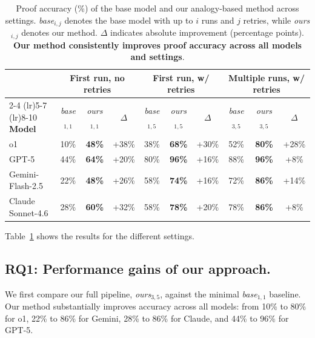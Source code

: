
\begin{table}[t]
\centering
\setlength{\tabcolsep}{5pt}
\begin{tabular}{l | ccc | ccc | ccc}
\toprule
& \multicolumn{3}{c}{\textbf{First run, no retries}} 
& \multicolumn{3}{c}{\textbf{First run, w/ retries}} 
& \multicolumn{3}{c}{\textbf{Multiple runs, w/ retries}} \\
\cmidrule(lr){2-4} \cmidrule(lr){5-7} \cmidrule(lr){8-10}
\textbf{Model }
& \textit{base}$_{1,1}$ & \textit{ours}$_{1,1}$ & $\Delta$ 
& \textit{base}$_{1,5}$ & \textit{ours}$_{1,5}$ & $\Delta$ 
& \textit{base}$_{3,5}$ & \textit{ours}$_{3,5}$ & $\Delta$ \\
\midrule
o1 
& 10\% & \textbf{48\%} & +38\% 
& 38\% & \textbf{68\%} & +30\% 
& 52\% & \textbf{80\%} & +28\% \\

GPT-5 
& 44\% & \textbf{64\%} & +20\% 
& 80\% & \textbf{96\%} & +16\% 
& 88\% & \textbf{96\%} & +8\% \\

Gemini-Flash-2.5 
& 22\% & \textbf{48\%} & +26\% 
& 58\% & \textbf{74\%} & +16\% 
& 72\% & \textbf{86\%} & +14\% \\

Claude Sonnet-4.6 
& 28\% & \textbf{60\%} & +32\% 
& 58\% & \textbf{78\%} & +20\% 
& 78\% & \textbf{86\%} & +8\% \\
\bottomrule
\end{tabular}
\caption{Proof accuracy (\%) of the base model and our analogy-based method across settings. \textit{base}$_{i,j}$ denotes the base model with up to $i$ runs and $j$ retries, while \textit{ours}$_{i,j}$ denotes our method. $\Delta$ indicates absolute improvement (percentage points). \textbf{Our method consistently improves proof accuracy across all models and settings}.}
\label{tab:main_results_tab}
\end{table}






Table~\ref{tab:main_results_tab} shows the results for the different settings. 

\subsection{RQ1: Performance gains of our approach.}
We first compare our full pipeline, \textit{ours}$_{3,5}$, against the minimal \textit{base}$_{1,1}$ baseline. Our method substantially improves accuracy across all models: from 10\% to 80\% for o1, 22\% to 86\% for Gemini, 28\% to 86\% for Claude, and 44\% to 96\% for GPT-5.

